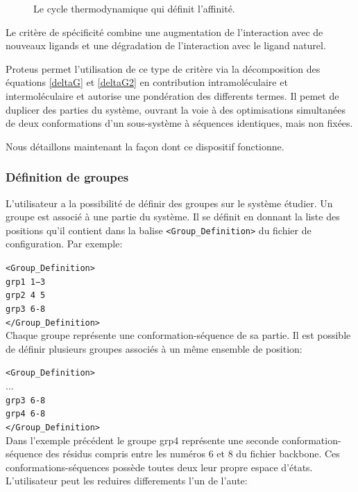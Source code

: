 \begin{enumerate}
\begin{figure}[!htbp]
     \caption{Le cycle thermodynamique qui définit l'affinité.}
\label{fig:cycleThermoLigand}
   \end{figure}

Le critère de spécificité combine une augmentation de l'interaction avec de nouveaux ligands et une dégradation de l'interaction avec le ligand naturel.

Proteus permet l'utilisation de ce type de critère via la décomposition des équations \ref{deltaG} et \ref{deltaG2} en contribution intramoléculaire et intermoléculaire et autorise une pondération des differents termes. Il pemet de duplicer des parties du système, ouvrant la voie à des optimisations simultanées de deux conformations d'un sous-système à séquences identiques, mais non fixées.   

Nous détaillons maintenant la façon dont ce dispositif fonctionne.

\subsubsection{Définition de groupes}
\label{sub:group}
L'utilisateur a la possibilité de définir des groupes sur le système étudier. Un groupe est associé à une partie du système. Il se définit en donnant la liste des positions qu'il contient dans la balise \verb!<Group_Definition>! du fichier de configuration. Par exemple:

\verb!<Group_Definition>! \\
\verb!grp1 1−3! \\
\verb!grp2 4 5! \\
\verb!grp3 6-8! \\
\verb!</Group_Definition>! \\

Chaque groupe représente une conformation-séquence de sa partie. Il est possible de définir plusieurs groupes associés à un même ensemble de position:

\verb!<Group_Definition>! \\
... \\
\verb!grp3 6-8! \\
\verb!grp4 6-8! \\
\verb!</Group_Definition>! \\

Dans l'exemple précédent le groupe grp4 représente une seconde conformation-séquence des résidus compris entre les numéros 6 et 8 du fichier backbone. Ces conformations-séquences possède toutes deux leur propre espace d'états. L'utilisateur peut les reduires differements l'un de l'aute:



\end{enumerate}
